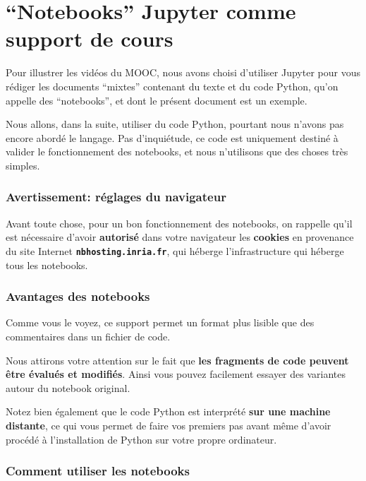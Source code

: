     \hypertarget{notebooks-jupyter-comme-support-de-cours}{%
\section{``Notebooks'' Jupyter comme support de
cours}\label{notebooks-jupyter-comme-support-de-cours}}

    Pour illustrer les vidéos du MOOC, nous avons choisi d'utiliser Jupyter
pour vous rédiger les documents ``mixtes'' contenant du texte et du code
Python, qu'on appelle des ``notebooks'', et dont le présent document est
un exemple.

Nous allons, dans la suite, utiliser du code Python, pourtant nous
n'avons pas encore abordé le langage. Pas d'inquiétude, ce code est
uniquement destiné à valider le fonctionnement des notebooks, et nous
n'utilisons que des choses très simples.

    \hypertarget{avertissement-ruxe9glages-du-navigateur}{%
\subsubsection{Avertissement: réglages du
navigateur}\label{avertissement-ruxe9glages-du-navigateur}}

    Avant toute chose, pour un bon fonctionnement des notebooks, on rappelle
qu'il est nécessaire d'avoir \textbf{autorisé} dans votre navigateur les
\textbf{cookies} en provenance du site Internet
\textbf{\texttt{nbhosting.inria.fr}}, qui héberge l'infrastructure qui
héberge tous les notebooks.

    \hypertarget{avantages-des-notebooks}{%
\subsubsection{Avantages des notebooks}\label{avantages-des-notebooks}}

    Comme vous le voyez, ce support permet un format plus lisible que des
commentaires dans un fichier de code.

    Nous attirons votre attention sur le fait que \textbf{les fragments de
code peuvent être évalués et modifiés}. Ainsi vous pouvez facilement
essayer des variantes autour du notebook original.

Notez bien également que le code Python est interprété \textbf{sur une
machine distante}, ce qui vous permet de faire vos premiers pas avant
même d'avoir procédé à l'installation de Python sur votre propre
ordinateur.

    \hypertarget{comment-utiliser-les-notebooks}{%
\subsubsection{Comment utiliser les
notebooks}\label{comment-utiliser-les-notebooks}}


